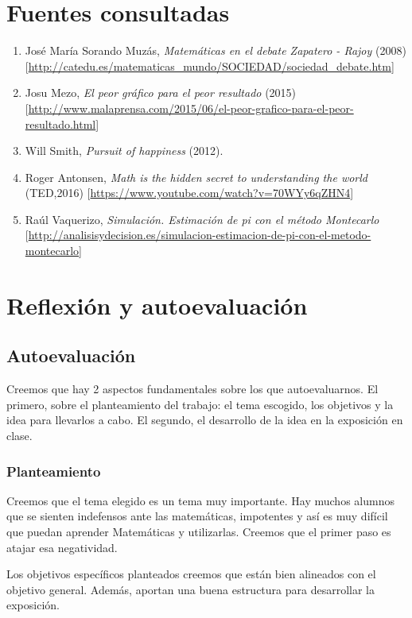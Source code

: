 \newpage
\section{Fuentes consultadas}

\begin{enumerate}
\item José María Sorando Muzás, \textit{Matemáticas en el debate Zapatero - Rajoy} (2008) [\url{http://catedu.es/matematicas_mundo/SOCIEDAD/sociedad_debate.htm}]
\item Josu Mezo, \textit{El peor gráfico para el peor resultado} (2015) [\url{http://www.malaprensa.com/2015/06/el-peor-grafico-para-el-peor-resultado.html}]
\item Will Smith, \textit{Pursuit of happiness} (2012).
\item Roger Antonsen, \textit{Math is the hidden secret to understanding the world } (TED,2016) [\url{https://www.youtube.com/watch?v=70WYy6qZHN4}]
\item Raúl Vaquerizo, \textit{Simulación. Estimación de pi con el método Montecarlo } [\url{http://analisisydecision.es/simulacion-estimacion-de-pi-con-el-metodo-montecarlo}]
\end{enumerate}

\section{Reflexión y autoevaluación}


\subsection{Autoevaluación}

Creemos que hay 2 aspectos fundamentales sobre los que autoevaluarnos. 
%
El primero, sobre el planteamiento del trabajo: el tema escogido, los objetivos y la idea para llevarlos a cabo.
%
El segundo, el desarrollo de la idea en la exposición en clase.

\subsubsection{Planteamiento}

Creemos que el tema elegido es un tema muy importante.
%
Hay muchos alumnos que se sienten indefensos ante las matemáticas, impotentes y así es muy difícil que puedan aprender Matemáticas y utilizarlas. Creemos que el primer paso es atajar esa negatividad.

Los objetivos específicos planteados creemos que están bien alineados con el objetivo general. 
%
Además, aportan una buena estructura para desarrollar la exposición.

